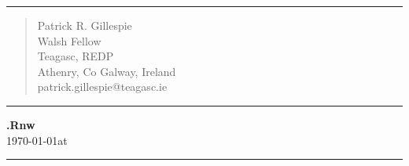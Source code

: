 \documentclass{article}\usepackage[]{graphicx}\usepackage[]{color}
\begin{document}
\hrule
\begin{quote}
  \begin{flushleft}
    Patrick R. Gillespie\\
    Walsh Fellow\\
    Teagasc, REDP\\
    Athenry, Co Galway, Ireland\\
    patrick.gillespie@teagasc.ie\\
  \end{flushleft}
\end{quote}
\hrule
\begin{flushleft}
  \textbf{\jobname.Rnw}\\
  \today at \currenttime
\end{flushleft}
\hrule
\vspace{1cm}
\end{document}
